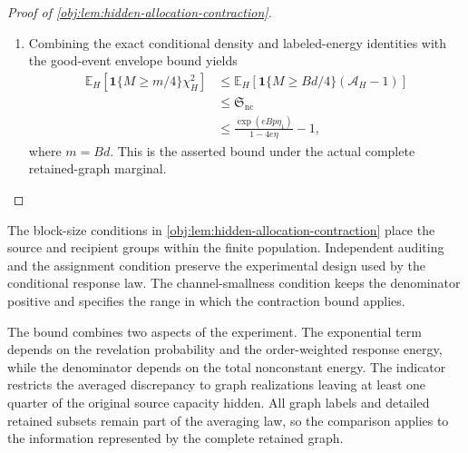 \documentclass[11pt]{article}
\begin{document}
\begin{proof}[Proof of \cref{obj:lem:hidden-allocation-contraction}]
\begin{enumerate}
The detailed retained graph generated by a partition and audit array is
\[
H(S,W)
:=
\{(j,i):
\exists\ell,\ j\in S_\ell,\ i\in C_\ell,\ W_{ji}=1\}.
\]
Averaging the fixed-partition inequality over the uniform partition law thus averages over the actual marginal of this full graph:
\[
\begin{aligned}
\mathbb E_H\!\left[
\mathbf1\{M\ge Bd/4\}(\mathcal A_H-1)
\right]
&=
\mathbb E_S\!\left[
\mathbb E\!\left[
\mathbf1\{M\ge Bd/4\}(\mathcal A_{H(S,W)}-1)
\mid S
\right]\right]
\\
&\le\mathfrak S_{\mathrm{nc}}.
\end{aligned}
\]
This average includes every source label and every retained-edge subset.

\item Combining the exact conditional density and labeled-energy identities with the good-event envelope bound yields
\[
\begin{aligned}
\mathbb E_H\!\left[
\mathbf1\{M\ge m/4\}\chi_H^2
\right]
&\le
\mathbb E_H\!\left[
\mathbf1\{M\ge Bd/4\}(\mathcal A_H-1)
\right]
\\
&\le\mathfrak S_{\mathrm{nc}}
\\
&\le
\frac{\exp(eBp\eta_1)}{1-4e\eta}-1,
\end{aligned}
\]
where \(m=Bd\). This is the asserted bound under the actual complete retained-graph marginal.
\end{enumerate}
\end{proof}

The block-size conditions in \cref{obj:lem:hidden-allocation-contraction} place the source and recipient groups within the finite population. Independent auditing and the assignment condition preserve the experimental design used by the conditional response law. The channel-smallness condition keeps the denominator positive and specifies the range in which the contraction bound applies.

The bound combines two aspects of the experiment. The exponential term depends on the revelation probability and the order-weighted response energy, while the denominator depends on the total nonconstant energy. The indicator restricts the averaged discrepancy to graph realizations leaving at least one quarter of the original source capacity hidden. All graph labels and detailed retained subsets remain part of the averaging law, so the comparison applies to the information represented by the complete retained graph.
\end{document}
